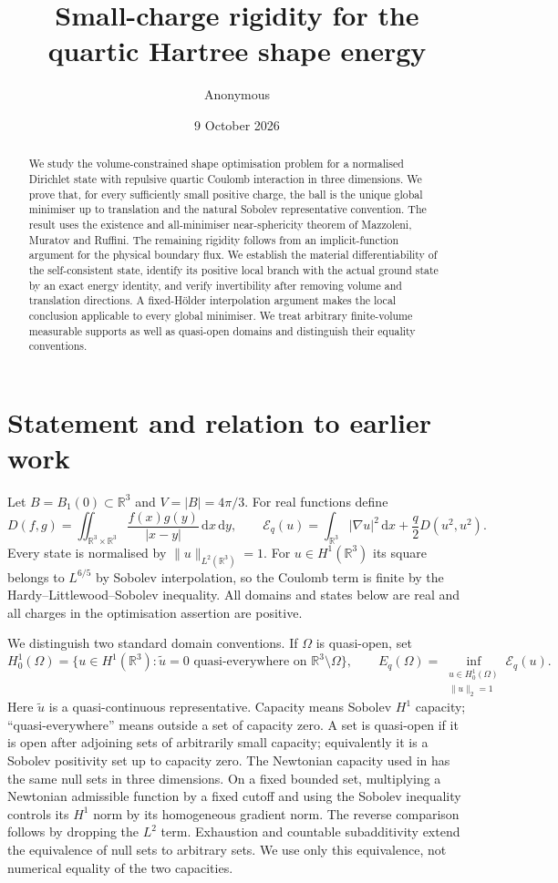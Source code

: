 \documentclass[11pt,a4paper]{article}
\title{Small-charge rigidity for the quartic Hartree shape energy}
\author{Anonymous}
\date{9 October 2026}
\theoremstyle{definition}
\theoremstyle{remark}
\newcommand{\R}{\mathbb R}
\newcommand{\dd}{\,\mathrm d}
\begin{document}
\maketitle
\begin{abstract}
We study the volume-constrained shape optimisation problem for a normalised Dirichlet state with repulsive quartic Coulomb interaction in three dimensions. We prove that, for every sufficiently small positive charge, the ball is the unique global minimiser up to translation and the natural Sobolev representative convention. The result uses the existence and all-minimiser near-sphericity theorem of Mazzoleni, Muratov and Ruffini. The remaining rigidity follows from an implicit-function argument for the physical boundary flux. We establish the material differentiability of the self-consistent state, identify its positive local branch with the actual ground state by an exact energy identity, and verify invertibility after removing volume and translation directions. A fixed-H\"older interpolation argument makes the local conclusion applicable to every global minimiser. We treat arbitrary finite-volume measurable supports as well as quasi-open domains and distinguish their equality conventions.
\end{abstract}

\section{Statement and relation to earlier work}\label{sec:intro}
Let $B=B_1(0)\subset\R^3$ and $V=|B|=4\pi/3$. For real functions define
\[
 D(f,g)=\iint_{\R^3\times\R^3}\frac{f(x)g(y)}{|x-y|}\dd x\dd y,
 \qquad
 \mathcal E_q(u)=\int_{\R^3}|\nabla u|^2\dd x+\frac q2D(u^2,u^2).
\]
Every state is normalised by $\|u\|_{L^2(\R^3)}=1$. For $u\in H^1(\R^3)$ its square belongs to $L^{6/5}$ by Sobolev interpolation, so the Coulomb term is finite by the Hardy--Littlewood--Sobolev inequality. All domains and states below are real and all charges in the optimisation assertion are positive.

We distinguish two standard domain conventions. If $\Omega$ is quasi-open, set
\[
 H^1_0(\Omega)=\{u\in H^1(\R^3):\widetilde u=0\text{ quasi-everywhere on }\R^3\setminus\Omega\},
 \qquad
 E_q(\Omega)=\inf_{\substack{u\in H^1_0(\Omega)\\\|u\|_2=1}}\mathcal E_q(u).
\]
Here $\widetilde u$ is a quasi-continuous representative. Capacity means Sobolev $H^1$ capacity; ``quasi-everywhere'' means outside a set of capacity zero. A set is quasi-open if it is open after adjoining sets of arbitrarily small capacity; equivalently it is a Sobolev positivity set up to capacity zero. The Newtonian capacity used in \cite[Section 2.3]{MMR2025} has the same null sets in three dimensions. On a fixed bounded set, multiplying a Newtonian admissible function by a fixed cutoff and using the Sobolev inequality controls its $H^1$ norm by its homogeneous gradient norm. The reverse comparison follows by dropping the $L^2$ term. Exhaustion and countable subadditivity extend the equivalence of null sets to arbitrary sets. We use only this equivalence, not numerical equality of the two capacities.
\end{document}
